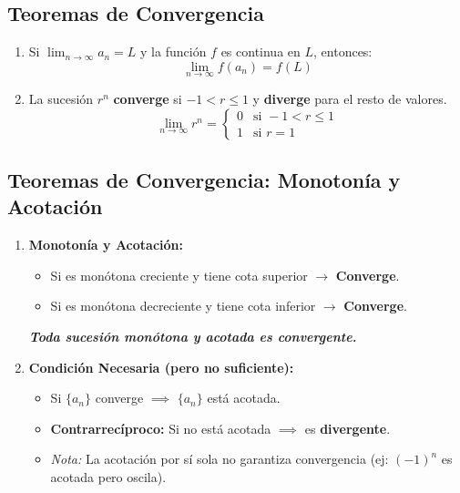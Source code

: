 \documentclass[a4paper,12pt]{article}
\begin{document}
\subsection{Teoremas de Convergencia}
\begin{enumerate}
    \item Si $\lim_{n \to \infty} a_n = L$ y la función $f$ es continua en $L$, entonces: 
    $$ \lim_{n \to \infty} f(a_n) = f(L) $$
    \item La sucesión ${r^n}$ \textbf{converge} si $-1 < r \leqslant 1$ y \textbf{diverge} para el resto de valores.
    $$\lim_{n \to \infty} r^n = \begin{cases} 0 & \text{si } -1 < r \leqslant 1 \\ 1 & \text{si } r = 1 \end{cases}$$
\end{enumerate}

\subsection{Teoremas de Convergencia: Monotonía y Acotación}
\begin{enumerate}
    \item \textbf{Monotonía y Acotación:}
    \begin{itemize}
        \item Si es monótona creciente y tiene cota superior $\rightarrow$ \textbf{Converge}.
        \item Si es monótona decreciente y tiene cota inferior $\rightarrow$ \textbf{Converge}.
    \end{itemize}
    \textbf{\textit{Toda sucesión monótona y acotada es convergente.}}

    \item \textbf{Condición Necesaria (pero no suficiente):}
    \begin{itemize}
        \item Si $\{a_n\}$ converge $\implies$ $\{a_n\}$ está acotada.
        \item \textbf{Contrarrecíproco:} Si no está acotada $\implies$ es \textbf{divergente}.
        \item \textit{Nota:} La acotación por sí sola no garantiza convergencia (ej: $(-1)^n$ es acotada pero oscila).
    \end{itemize}
\end{enumerate}
\end{document}
